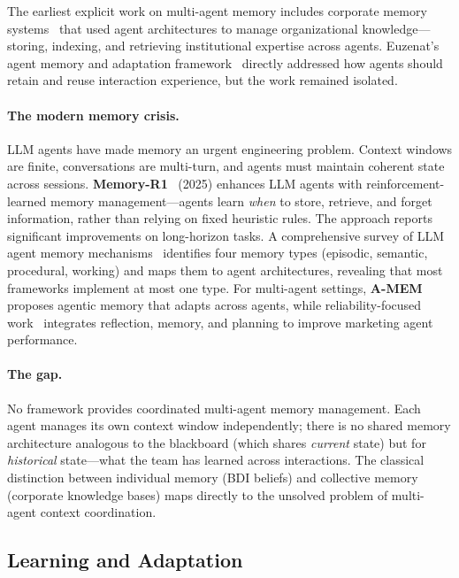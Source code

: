 \documentclass{article}
\begin{document}
The earliest explicit work on multi-agent memory includes corporate memory
systems~\citep{sutra23173_multiagent2000, sutra22179_multiagent2002} that used agent
architectures to manage organizational knowledge---storing, indexing, and retrieving
institutional expertise across agents. Euzenat's agent memory and adaptation
framework~\citep{sutra22129_agent2003} directly addressed how agents should retain
and reuse interaction experience, but the work remained isolated.

\paragraph{The modern memory crisis.}
LLM agents have made memory an urgent engineering problem. Context windows are finite,
conversations are multi-turn, and agents must maintain coherent state across sessions.
\textbf{Memory-R1}~\citep{sutra6506_memoryr2025} (2025) enhances LLM agents with
reinforcement-learned memory management---agents learn \emph{when} to store, retrieve,
and forget information, rather than relying on fixed heuristic rules. The approach
reports significant improvements on long-horizon tasks.
A comprehensive survey of LLM agent memory mechanisms~\citep{sutra21811_survey2025}
identifies four memory types (episodic, semantic, procedural, working) and maps them
to agent architectures, revealing that most frameworks implement at most one type.
For multi-agent settings, \textbf{A-MEM}~\citep{sutra2578_amem2025} proposes agentic
memory that adapts across agents, while reliability-focused
work~\citep{sutra8238_reliable2025} integrates reflection, memory, and planning to
improve marketing agent performance.

\paragraph{The gap.}
No framework provides coordinated multi-agent memory management. Each agent manages
its own context window independently; there is no shared memory architecture analogous
to the blackboard (which shares \emph{current} state) but for \emph{historical}
state---what the team has learned across interactions. The classical distinction
between individual memory (BDI beliefs) and collective memory (corporate knowledge
bases) maps directly to the unsolved problem of multi-agent context coordination.

\subsection{Learning and Adaptation}
\label{sec:p-learning}
\end{document}
